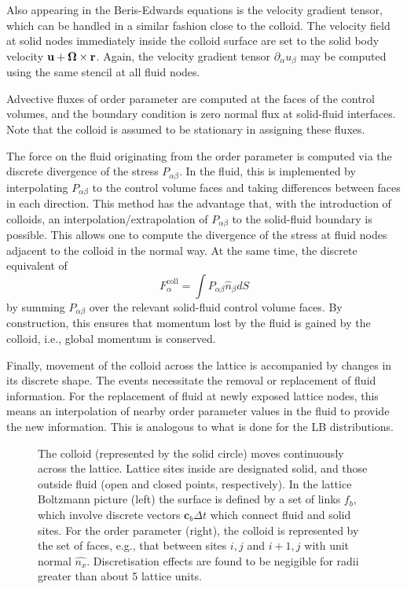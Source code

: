 Also appearing in the Beris-Edwards equations is the velocity
gradient tensor, which can be handled in a similar fashion
close to the colloid. The velocity field at solid nodes
immediately inside the colloid surface are set to the solid
body velocity $\bf{u} + \bf{\Omega} \times \bf{r}$. Again,
the velocity gradient tensor $\partial_\alpha u_\beta$ may
be computed using the same stencil at all fluid nodes.

Advective fluxes of order parameter are computed at the faces
of the control volumes, and the boundary condition is zero
normal flux at solid-fluid interfaces. Note that the colloid
is assumed to be stationary in assigning these fluxes.

The force on the fluid originating from the order parameter
is computed via the discrete divergence of the stress
$P_{\alpha\beta}$. In the fluid, this is implemented by
interpolating $P_{\alpha\beta}$ to the control volume faces
and taking differences between faces in each direction. This
method has the advantage that, with the introduction of colloids,
an interpolation/extrapolation of $P_{\alpha\beta}$ to the
solid-fluid boundary is possible. This allows one to compute the
divergence of the stress at fluid nodes adjacent to the colloid
in the normal way. At the same time, the discrete equivalent of
\begin{equation}
F_\alpha^\mathrm{coll} = \int P_{\alpha\beta} \hat{n}_\beta dS
\end{equation}
by summing $P_{\alpha\beta}$ over the relevant solid-fluid control
volume faces. By construction, this ensures that momentum lost by
the fluid is gained by the colloid, i.e., global momentum is
conserved.

Finally, movement of the colloid across the lattice is accompanied
by changes in its discrete shape. The events necessitate the
removal or replacement of fluid information. For the replacement
of fluid at newly exposed lattice nodes, this means an
interpolation of nearby order parameter values in the fluid to
provide the new information. This is analogous to what is done
for the LB distributions.


\begin{figure}[h]
\begin{center}

%

\end{center}
\caption{The colloid (represented by the solid circle) moves continuously
across the lattice. Lattice sites inside are designated solid, and those
outside fluid (open and closed points, respectively). In the lattice
Boltzmann picture (left) the surface is defined by a set of links
$f_b$, which involve discrete vectors $\mathbf{c}_b \Delta t$ which
connect fluid and solid sites. For the order parameter (right), the
colloid is represented by the set of faces, e.g., that between sites
$i,j$ and $i+1,j$ with unit normal $\hat{n_x}$. Discretisation effects
are found to be negigible for radii greater than about 5 lattice units.}
\end{figure}
